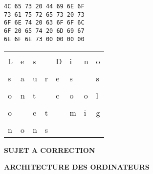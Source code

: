 \documentclass[11pt,a4paper]{article}
\newcommand{\TitreMatiere}{Architecture des Ordinateurs}
\begin{document}
\begin{table}[ht!]
  \centering
  \begin{minipage}{0.4\textwidth}
    \centering
\begin{lstlisting}[style=algorithmique]
4C 65 73 20 44 69 6E 6F
73 61 75 72 65 73 20 73
6F 6E 74 20 63 6F 6F 6C
6F 20 65 74 20 6D 69 67
6E 6F 6E 73 00 00 00 00
\end{lstlisting}
  \end{minipage}
  \hfillx
  \begin{minipage}{0.45\textwidth}
    \centering

\begin{tabular}{ | m{0.45cm} | m{0.45cm} | m{0.45cm} | m{0.45cm}   |   m{0.45cm} | m{0.45cm} | m{0.45cm} | m{0.45cm} | }
\hline
   &   &   &   &   &   &   &   \\
 L & e & s &   & D & i & n & o \\
\hline
   &   &   &   &   &   &   &   \\
 s & a & u & r & e & s &   & s \\
\hline
   &   &   &   &   &   &   &   \\
 o & n & t &   & c & o & o & l \\
\hline
   &   &   &   &   &   &   &   \\
 o &   & e & t &   & m & i & g \\
\hline
   &   &   &   &   &   &   &   \\
 n & o & n & s &   &   &   &   \\
\hline
\end{tabular}

  \end{minipage}
\end{table}



%
%

\newpage



\vfillFirst

\begin{center}

\begin{LARGE}
\textbf{SUJET A CORRECTION}

\bigskip

\textbf{\MakeUppercase{\TitreMatiere}}
\end{LARGE}

\end{center}

\vfillLast
\end{document}
